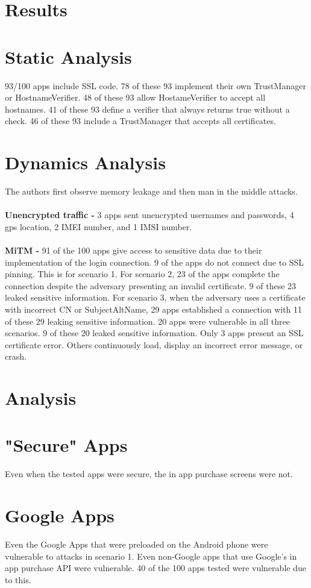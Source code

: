 \documentclass{article}
\begin{document}
\section{Results}
\section*{Static Analysis}
93/100 apps include SSL code. 78 of these 93 implement their own TrustManager or HostnameVerifier. 48 of these 93 allow HostameVerifier to accept all hostnames. 41 of these 93 define a verifier that always returns true without a check. 46 of these 93 include a TrustManager that accepts all certificates. 

\section*{Dynamics Analysis}
The authors first observe memory leakage and then man in the middle attacks.
\\\\\textbf{Unencrypted traffic -} 3 apps sent unencrypted usernames and passwords, 4 gps location, 2 IMEI number, and 1 IMSI number.
\\\\\textbf{MiTM -} 91 of the 100 apps give access to sensitive data due to their implementation of the login connection. 9 of the apps do not connect due to SSL pinning. This is for scenario 1. For scenario 2, 23 of the apps complete the connection despite the adversary presenting an invalid certificate. 9 of these 23 leaked sensitive information. For scenario 3, when the adversary uses a certificate with incorrect CN or SubjectAltName, 29 apps established a connection with 11 of these 29 leaking sensitive information. 20 apps were vulnerable in all three scenarios. 9 of these 20 leaked sensitive information. Only 3 apps present an SSL certificate error. Others continuously load, display an incorrect error message, or crash. 

\section{Analysis}
\section*{"Secure" Apps}
Even when the tested apps were secure, the in app purchase screens were not.
\section*{Google Apps}
Even the Google Apps that were preloaded on the Android phone were vulnerable to attacks in scenario 1. Even non-Google apps that use Google's in app purchase API were vulnerable. 40 of the 100 apps tested were vulnerable due to this. 
\end{document}

